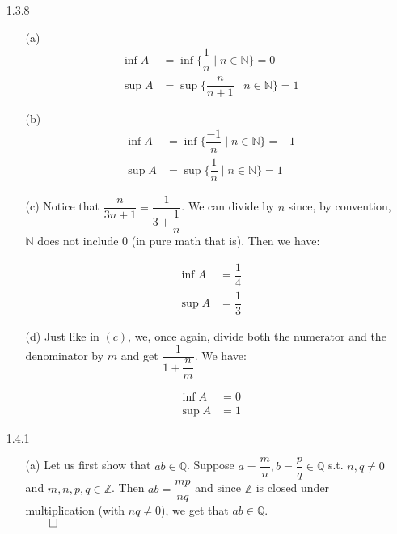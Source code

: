 \documentclass[11pt]{article}
\newcommand{\nats}{\mathbb{N}}
\newcommand{\ints}{\mathbb{Z}}
\newcommand{\rats}{\mathbb{Q}}
\begin{document}
\begin{itemize}
    \item[1.3.8]
        \begin{itemize}
            \item[(a)]
                \begin{align*}
                    \inf{A} &= \inf{\{\dfrac{1}{n}     \mid n \in \nats\}} = 0\\
                    \sup{A} &= \sup{\{\dfrac{n}{n + 1} \mid n \in \nats\}} = 1
                \end{align*}

            \item[(b)]
                \begin{align*}
                    \inf{A} &= \inf{\{\dfrac{-1}{n} \mid n \in \nats\}} = -1\\
                    \sup{A} &= \sup{\{\dfrac{1}{n}  \mid n \in \nats\}} = 1
                \end{align*}

            \newpage

            \item[(c)]
                Notice that $\dfrac{n}{3n + 1} = \dfrac{1}{3 + \dfrac{1}{n}}$.
                We can divide by $n$ since, by convention, $\nats$ does not
                include $0$ (in pure math that is). Then we have:

                \begin{align*}
                    \inf{A} &= \dfrac{1}{4}\\
                    \sup{A} &= \dfrac{1}{3}
                \end{align*}

            \item[(d)]
                Just like in $(c)$, we, once again, divide both the numerator
                and the denominator by $m$ and get $\dfrac{1}{1 +
                \dfrac{n}{m}}$. We have:

                \begin{align*}
                    \inf{A} &= 0\\
                    \sup{A} &= 1
                \end{align*}
        \end{itemize}

    \item[1.4.1]
        \begin{itemize}
            \item[(a)]
                Let us first show that $ab \in \rats$.
                Suppose $a = \dfrac{m}{n}, b = \dfrac{p}{q} \in \rats$ s.t.
                $n, q \neq 0$ and $m, n, p, q \in \ints$. Then $ab =
                \dfrac{mp}{nq}$ and since $\ints$ is closed under
                multiplication (with $nq \neq 0$), we get that $ab \in \rats$.
                \\
                $\qed$


\end{itemize}
\end{itemize}
\end{document}
